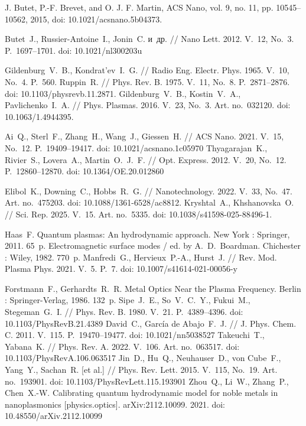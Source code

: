 \documentclass[12pt, a4paper]{article}
\begin{document}
\begin{thebibliography}{99}
J. Butet, P.-F. Brevet, and O. J. F. Martin, {ACS Nano}, vol. 9, no. 11, pp. 10545–10562, 2015, doi: 10.1021/acsnano.5b04373.

Butet~J., Russier-Antoine~I., Jonin~C. и~др. // Nano Lett. 2012. V.~12, No.~3. P.~1697--1701. doi: 10.1021/nl300203u

Gildenburg~V.~B., Kondrat’ev~I.~G. // Radio Eng. Electr. Phys. 1965. V.~10, No.~4. P.~560.
Ruppin~R. // Phys. Rev. B. 1975. V.~11, No.~8. P.~2871--2876. doi: 10.1103/physrevb.11.2871.
Gildenburg~V.~B., Kostin~V.~A., Pavlichenko~I.~A. // Phys. Plasmas. 2016. V.~23, No.~3. Art. no.~032120. doi: 10.1063/1.4944395.


Ai~Q., Sterl~F., Zhang~H., Wang~J., Giessen~H. // ACS Nano. 2021. V.~15, No.~12. P.~19409--19417. doi: 10.1021/acsnano.1c05970
Thyagarajan~K., Rivier~S., Lovera~A., Martin~O.~J.~F. // Opt. Express. 2012. V.~20, No.~12. P.~12860--12870. doi: 10.1364/OE.20.012860


Elibol~K., Downing~C., Hobbs~R.~G. // Nanotechnology. 2022. V.~33, No.~47. Art. no.~475203. doi: 10.1088/1361-6528/ac8812.
Kryshtal~A., Khshanovska~O. // Sci. Rep. 2025. V.~15. Art. no.~5335. doi: 10.1038/s41598-025-88496-1.

Haas~F. Quantum plasmas: An hydrodynamic approach. New York : Springer, 2011. 65~p.
Electromagnetic surface modes / ed. by A.~D.~Boardman. Chichester : Wiley, 1982. 770~p.
Manfredi~G., Hervieux~P.-A., Hurst~J. // Rev. Mod. Plasma Phys. 2021. V.~5. P.~7. 
doi: 10.1007/s41614-021-00056-y


Forstmann~F., Gerhardts~R.~R. Metal Optics Near the Plasma Frequency. Berlin : Springer-Verlag, 1986. 132~p.
Sipe~J.~E., So~V.~C.~Y., Fukui~M., Stegeman~G.~I. // Phys. Rev. B. 1980. V.~21. P.~4389--4396. doi: 10.1103/PhysRevB.21.4389
David~C., Garc\'{i}a de Abajo~F.~J. // J. Phys. Chem. C. 2011. V.~115. P.~19470--19477. doi: 10.1021/nn5038527
Takeuchi~T., Yabana~K. // Phys. Rev. A. 2022. V.~106. Art. no.~063517. doi: 10.1103/PhysRevA.106.063517
Jin~D., Hu~Q., Neuhauser~D., von Cube~F., Yang~Y., Sachan~R. [et al.] // Phys. Rev. Lett. 2015. V.~115, No.~19. Art. no.~193901. doi: 10.1103/PhysRevLett.115.193901
Zhou~Q., Li~W., Zhang~P., Chen~X.-W. Calibrating quantum hydrodynamic model for noble metals in nanoplasmonics [physics.optics]. arXiv:2112.10099. 2021. doi: 10.48550/arXiv.2112.10099


\end{thebibliography}
\end{document}
